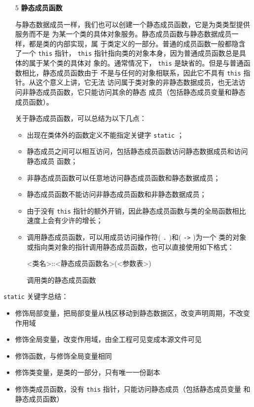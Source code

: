 \begin{itemize}
\item [5] \textbf{静态成员函数}

  与静态数据成员一样，我们也可以创建一个静态成员函数，它是为类类型提供服务而不是
  为某一个类的具体对象服务。静态成员函数与静态数据成员一样，都是类的内部实现，属
  于类定义的一部分。普通的成员函数一般都隐含了一个 \verb|this| 指针，
  \verb|this| 指针指向类的对象本身，因为普通成员函数总是具体的属于某个类的具体对
  象的。通常情况下， \verb|this| 是缺省的。但是与普通函数相比，静态成员函数由于
  不是与任何的对象相联系，因此它不具有 \verb|this| 指针。从这个意义上讲，它无法
  访问属于类对象的非静态数据成员，也无法访问非静态成员函数，它只能访问其余的静态
  成员（包括静态成员变量和静态成员函数）。

  关于静态成员函数，可以总结为以下几点：
  \begin{itemize}
  \item 出现在类体外的函数定义不能指定关键字 \verb|static| ；
  \item 静态成员之间可以相互访问，包括静态成员函数访问静态数据成员和访问静态成员
    函数；
  \item 非静态成员函数可以任意地访问静态成员函数和静态数据成员；
  \item 静态成员函数不能访问非静态成员函数和非静态数据成员；
  \item 由于没有 \verb|this| 指针的额外开销，因此静态成员函数与类的全局函数相比
    速度上会有少许的增长；
  \item 调用静态成员函数，可以用成员访问操作符( \verb|.| )和( \verb|->| )为一个
    类的对象或指向类对象的指针调用静态成员函数，也可以直接使用如下格式：

    \qquad <类名>::<静态成员函数名>(<参数表>)

    调用类的静态成员函数
  \end{itemize}  
\end{itemize}

\verb|static| 关键字总结：
\begin{itemize}
\item 修饰局部变量，把局部变量从栈区移动到静态数据区，改变声明周期，不改变作用域
\item 修饰全局变量，改变作用域，由全工程可见变成本源文件可见
\item 修饰函数，与修饰全局变量相同
\item 修饰类变量，是类的一部分，只有唯一一份副本
\item 修饰类成员函数，没有 \verb|this| 指针，只能访问静态成员（包括静态成员变量
  和静态成员函数）
\end{itemize}

